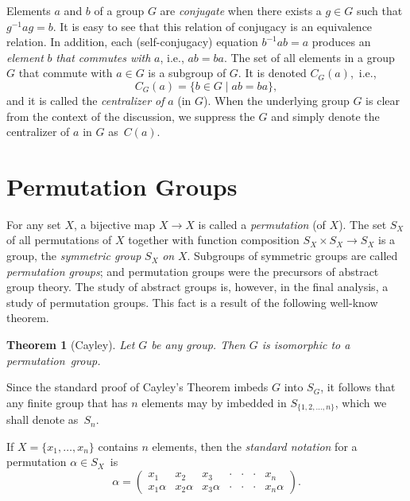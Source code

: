 \documentclass{surv-l}
\numberwithin{equation}{section}
\numberwithin{table}{section}
\numberwithin{figure}{section}
\theoremstyle{plain}
\newtheorem{theorem}[equation]{Theorem}
\theoremstyle{definition}
\begin{document}
Elements $a$ and $b$ of a group $G$ are \emph{conjugate} when there
exists a $g\in G$ such that $g^{-1}ag=b$. It is easy to see that
this relation of conjugacy is an equivalence relation. In
addition, each (self-conjugacy) equation $b^{-1}ab=a$ produces an
\emph{element} $b$ \emph{that commutes with} $a$, i.e., $ab=ba$.
The set of all elements in a group $G$ that commute with $a\in G$
is a subgroup of $G$. It is denoted $C_{G}(a)$,~i.e.,
\[
C_{G}(a) =\{b\in G\mid ab=ba\},
\]
and it is called the \emph{centralizer of} $a$ (in $G$). When the
underlying group $G$ is clear from the context of the discussion,
we suppress the $G$ and simply denote the centralizer of $a$ in $G$
as~$C(a)$.

\section{Permutation Groups}\label{secA.72}

For any set $X$, a bijective map $X\rightarrow X$ is called a
\emph{permutation} (of $X$). The set $S_{X}$ of all permutations
of $X$ together with function composition $S_{X}\times
S_{X}\rightarrow S_{X}$ is a group, the \emph{symmetric
group} $S_{X}$
\emph{on} $X$. Subgroups of symmetric groups are called
\emph{permutation groups}; and permutation groups were the
precursors of abstract group theory. The study of abstract groups
is, however, in the final analysis, a study of permutation groups.
This fact is a result of the following well-know theorem.

\begin{theorem}[Cayley]\label{thm12.72.1}
Let $G$ be any group. Then $G$ is isomorphic to a permutation~group.
\end{theorem}

Since the standard proof of Cayley's Theorem imbeds $G$ into $S_{G}$, it follows that any finite group
that has $n$ elements may by imbedded in $S_{\{1,2,\ldots,n\}}$,
which we shall denote as~$S_{n}$.

If $X=\{x_{1},\ldots, x_{n}\}$ contains $n$ elements, then the
\emph{standard notation} for a
permutation $\alpha\in S_{X}$~is
\[
\alpha=\left(\begin{matrix}
x_{1} & x_{2} & x_{3} &\cdot & \cdot &\cdot & x_{n}\\
x_{1}\alpha & x_{2}\alpha & x_{3}\alpha &\cdot&\cdot&\cdot & x_{n}\alpha
\end{matrix}\right).
\]
\end{document}
